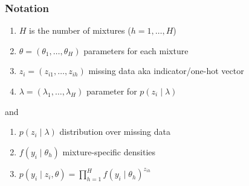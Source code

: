 \documentclass{beamer}
\begin{document}
\begin{frame}
\frametitle{Notation}


\begin{enumerate}
\item $H$ is the number of mixtures ($h=1, \ldots, H$)
\item $\theta = (\theta_1, \ldots, \theta_H)$ parameters for each mixture
\item $z_i = (z_{i1}, \ldots, z_{ih})$ missing data aka indicator/one-hot vector 
\item $\lambda = (\lambda_1, \ldots, \lambda_H)$ parameter for $p(z_i \mid \lambda)$
\end{enumerate}
and
\begin{enumerate}
\item $p(z_i \mid \lambda)$ distribution over missing data 
\item $f(y_i \mid \theta_h)$ mixture-specific densities
\item $p(y_i \mid z_i, \theta) = \prod_{h=1}^Hf(y_i \mid \theta_h)^{z_{ih}} $
\end{enumerate}

\end{frame}
\end{document}

